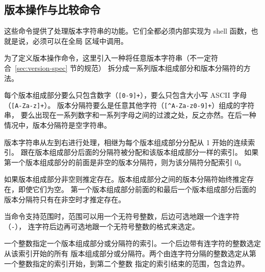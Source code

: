 \subsection{版本操作与比较命令}
这些命令提供了处理版本字符串的功能。它们全都必须内部实现为 shell 函数，也就是说，必须可以在全局
区域中调用。

为了定义版本操作命令，这里引入一种将任意版本字符串（不一定符合~\ref{sec:version-spec} 节的规范）
拆分成一系列版本组成部分和版本分隔符的方法。

每个版本组成部分要么只包含数字（\texttt{[0-9]+}）\hspace{0em}，要么只包含大小写 ASCII 字母（\texttt{[A-Za-z]+}）。
版本分隔符要么是任意其他字符（\texttt{[\textasciicircum A-Za-z0-9]+}）组成的字符串，
要么出现在一系列数字和一系列字母之间的过渡之处，反之亦然。在后一种情况中，版本分隔符是空字符串。

版本字符串从左到右进行处理，相继为每个版本组成部分分配从 1 开始的连续索引。
跟在版本组成部分后面的分隔符被分配和该版本组成部分一样的索引。
如果第一个版本组成部分的前面是非空的版本分隔符，则为该分隔符分配索引 0。

如果版本组成部分非空则推定存在。版本组成部分之间的版本分隔符始终推定存在，即使它们为空。
第一个版本组成部分前面的和最后一个版本组成部分后面的版本分隔符只有在非空时才推定存在。

当命令支持范围时，范围可以用一个无符号整数，后边可选地跟一个连字符（\texttt{-}），
连字符后边再可选地跟一个无符号整数的格式来选定。

一个整数指定一个版本组成部分或分隔符的索引。一个后边带有连字符的整数选定从该索引开始的所有
版本组成部分或分隔符。两个由连字符分隔的整数选定从第一个整数指定的索引开始，到第二个整数
指定的索引结束的范围，包含边界。

